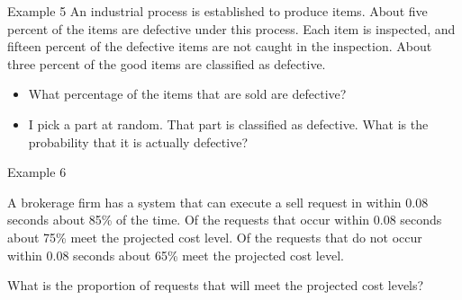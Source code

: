 \begin{frame}{Example 5}
  An industrial process is established to produce items. About five
  percent of the items are defective under this process. Each item is
  inspected, and fifteen percent of the defective items are not caught
  in the inspection. About three percent of the good items are
  classified as defective.

  \begin{itemize}
  \item What percentage of the items that are sold are defective?
  \item I pick a part at random. That part is classified as
    defective. What is the probability that it is actually defective?
  \end{itemize}

  \vfill

\end{frame}


\begin{frame}{Example 6}

  A brokerage firm has a system that can execute a sell request in
  within 0.08 seconds about 85\% of the time. Of the requests that
  occur within 0.08 seconds about 75\% meet the projected cost
  level. Of the requests that do not occur within 0.08 seconds about
  65\% meet the projected cost level.

  What is the proportion of requests that will meet the projected cost
  levels?

  \vfill
  
\end{frame}




